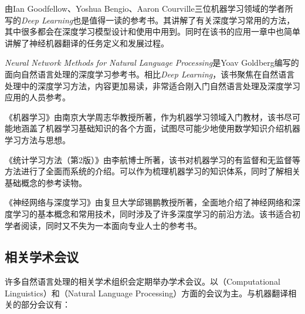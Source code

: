 \parinterval  由Ian Goodfellow、Yoshua Bengio、Aaron Courville三位机器学习领域的学者所写的\emph{Deep Learning}也是值得一读的参考书。其讲解了有关深度学习常用的方法，其中很多都会在深度学习模型设计和使用中用到。同时在该书的应用一章中也简单讲解了神经机器翻译的任务定义和发展过程。

\parinterval \emph{Neural Network Methods for Natural Language Processing}是Yoav Goldberg编写的面向自然语言处理的深度学习参考书。相比\emph{Deep Learning}，该书聚焦在自然语言处理中的深度学习方法，内容更加易读，非常适合刚入门自然语言处理及深度学习应用的人员参考。

\parinterval 《机器学习》由南京大学周志华教授所著，作为机器学习领域入门教材，该书尽可能地涵盖了机器学习基础知识的各个方面，试图尽可能少地使用数学知识介绍机器学习方法与思想。

\parinterval 《统计学习方法（第2版）》由李航博士所著，该书对机器学习的有监督和无监督等方法进行了全面而系统的介绍。可以作为梳理机器学习的知识体系，同时了解相关基础概念的参考读物。

\parinterval 《神经网络与深度学习》由复旦大学邱锡鹏教授所著，全面地介绍了神经网络和深度学习的基本概念和常用技术，同时涉及了许多深度学习的前沿方法。该书适合初学者阅读，同时又不失为一本面向专业人士的参考书。

\subsection{相关学术会议}

\parinterval 许多自然语言处理的相关学术组织会定期举办学术会议。以{\small{}}（Computational Linguistics）和{\small{}}（Natural Language Processing）方面的会议为主。与机器翻译相关的部分会议有：

